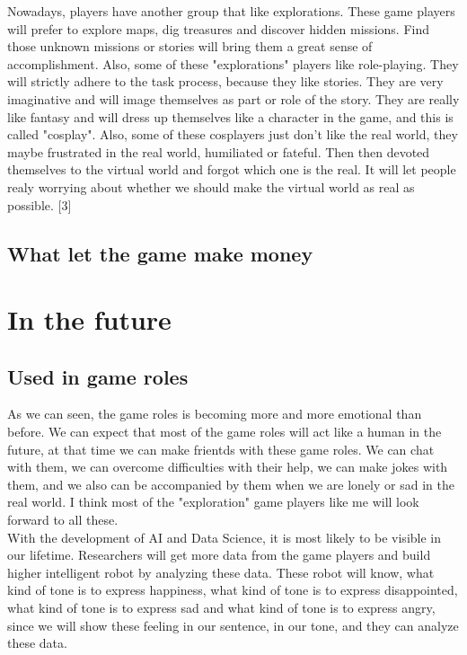 \documentclass[12pt]{article}
\begin{document}
            Nowadays, players have another group that like explorations. These game players will
            prefer to explore maps, dig treasures and discover hidden missions. Find those unknown
            missions or stories will bring them a great sense of accomplishment. Also, some of these
            "explorations" players like role-playing. They will strictly adhere to the task process,
            because they like stories. They are very imaginative and will image themselves as part
            or role of the story. They are really like fantasy and will dress up themselves like
            a character in the game, and this is called "cosplay". Also, some of these cosplayers
            just don't like the real world, they maybe frustrated in the real world, humiliated
            or fateful. Then then devoted themselves to the virtual world and forgot which one is
            the real. It will let people realy worrying about whether we should make the virtual
            world as real as possible.
            [3]
        \subsection{What let the game make money}
    \section{In the future}
        \subsection{Used in game roles}
            As we can seen, the game roles is becoming more and more emotional than before. We can
            expect that most of the game roles will act like a human in the future, at that time we
            can make frientds with these game roles. We can chat with them, we can overcome difficulties
            with their help, we can make jokes with them, and we also can be accompanied by them
            when we are lonely or sad in the real world. I think most of the "exploration" game players
            like me will look forward to all these.\\

            With the development of AI and Data Science, it is most likely to be visible in our lifetime.
            Researchers will get more data from the game players and build higher intelligent robot by
            analyzing these data. These robot will know, what kind of tone is to express happiness,
            what kind of tone is to express disappointed, what kind of tone is to express sad and
            what kind of tone is to express angry, since we will show these feeling in our sentence,
            in our tone, and they can analyze these data.\\
\end{document}
